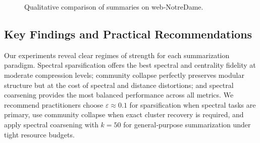 \begin{figure}[t]
  \centering
  \caption{Qualitative comparison of summaries on web‐NotreDame.}
  \label{fig:nd_vis}
\end{figure}

\subsection{Key Findings and Practical Recommendations}

Our experiments reveal clear regimes of strength for each summarization paradigm.  Spectral sparsification offers the best spectral and centrality fidelity at moderate compression levels; community collapse perfectly preserves modular structure but at the cost of spectral and distance distortions; and spectral coarsening provides the most balanced performance across all metrics.  We recommend practitioners choose \(\varepsilon\approx0.1\) for sparsification when spectral tasks are primary, use community collapse when exact cluster recovery is required, and apply spectral coarsening with \(k=50\) for general‐purpose summarization under tight resource budgets.
